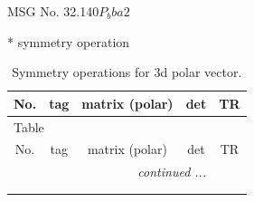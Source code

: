 \documentclass[fleqn,8pt]{jsarticle}
\begin{document}
\setcounter{MaxMatrixCols}{32}

\renewcommand{\tablename}{Table~}
\renewcommand{\figurename}{Figure~}
\begin{center}
\LARGE
MSG No. 32.140\quad$P_{b}ba2$
\end{center}
* symmetry operation
\renewcommand{\arraystretch}{1.3}
\begin{longtable}{ccccc}
\caption{Symmetry operations for 3d polar vector.}
 \\
 \hline \hline
No. & tag & matrix (polar) & det & TR \\ \hline \endfirsthead

\multicolumn{4}{l}{\tablename\ \thetable{}} \\
 \hline \hline
No. & tag & matrix (polar) & det & TR \\ \hline \endhead

 \hline \hline
\multicolumn{4}{r}{\footnotesize\it continued ...} \\ \endfoot

 \hline \hline
\multicolumn{4}{r}{} \\ \endlastfoot


\end{longtable}
\end{document}
